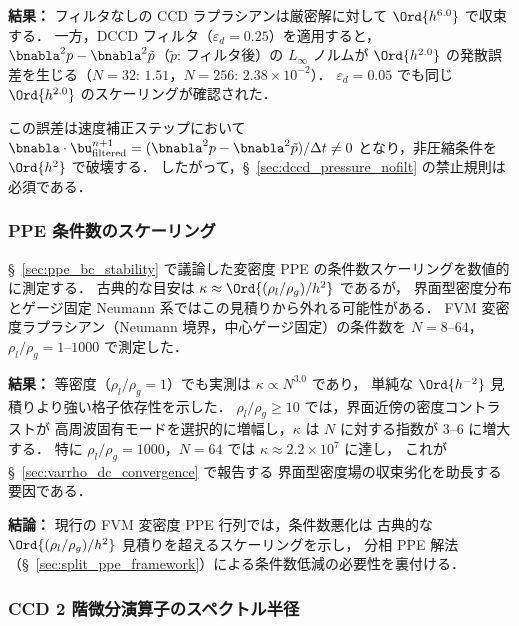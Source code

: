 \noindent\textbf{結果：}
フィルタなしの CCD ラプラシアンは厳密解に対して $\Ord{h^{6.0}}$ で収束する．
一方，DCCD フィルタ（$\varepsilon_d = 0.25$）を適用すると，
$\bnabla^2 p - \bnabla^2 \tilde{p}$（$\tilde{p}$: フィルタ後）の $L_\infty$ ノルムが
$\Ord{h^{2.0}}$ の発散誤差を生じる（$N = 32$: $1.51$，$N = 256$: $2.38 \times 10^{-2}$）．
$\varepsilon_d = 0.05$ でも同じ $\Ord{h^{2.0}}$ のスケーリングが確認された．

この誤差は速度補正ステップにおいて
$\bnabla \cdot \bu^{n+1}_{\mathrm{filtered}} =
(\bnabla^2 p - \bnabla^2 \tilde{p})/\Delta t \neq 0$
となり，非圧縮条件を $\Ord{h^2}$ で破壊する．
したがって，§~\ref{sec:dccd_pressure_nofilt} の禁止規則は必須である．

\subsubsection{PPE 条件数のスケーリング}
\label{sec:verify_ppe_condition}

§~\ref{sec:ppe_bc_stability} で議論した変密度 PPE の条件数スケーリングを数値的に測定する．
古典的な目安は $\kappa \approx \Ord{(\rho_l/\rho_g) / h^2}$ であるが，
界面型密度分布とゲージ固定 Neumann 系ではこの見積りから外れる可能性がある．
FVM 変密度ラプラシアン（Neumann 境界，中心ゲージ固定）の条件数を
$N = 8$--$64$，$\rho_l/\rho_g = 1$--$1000$ で測定した．

\noindent\textbf{結果：}
等密度（$\rho_l/\rho_g = 1$）でも実測は $\kappa \propto N^{3.0}$ であり，
単純な $\Ord{h^{-2}}$ 見積りより強い格子依存性を示した．
$\rho_l/\rho_g \geq 10$ では，界面近傍の密度コントラストが
高周波固有モードを選択的に増幅し，$\kappa$ は $N$ に対する指数が
3--6 に増大する．
特に $\rho_l/\rho_g = 1000$，$N = 64$ では $\kappa \approx 2.2 \times 10^7$ に達し，
これが §~\ref{sec:varrho_dc_convergence} で報告する
界面型密度場の収束劣化を助長する要因である．

\noindent\textbf{結論：}
現行の FVM 変密度 PPE 行列では，条件数悪化は
古典的な $\Ord{(\rho_l/\rho_g)/h^2}$ 見積りを超えるスケーリングを示し，
分相 PPE 解法（§~\ref{sec:split_ppe_framework}）による条件数低減の必要性を裏付ける．


\subsubsection{CCD 2 階微分演算子のスペクトル半径}
\label{sec:verify_ccd_spectral_radius}

